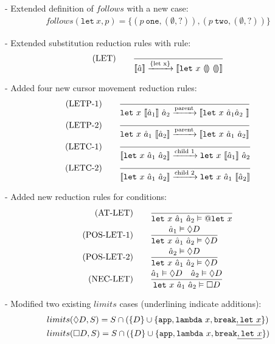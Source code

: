 \documentclass[10pt,a4paper,english]{article}
\newcommand\letin[3]{\texttt{let}~#1~#2~#3}
\begin{document}
- Extended definition of $follows$ with a new case:
\begin{align}
follows(\texttt{let}~x, p) = \{ (p~\texttt{one}, (\emptyset, ?)), (p~\texttt{two}, (\emptyset, ?)) \}
\end{align}


- Extended substitution reduction rules with rule:
\begin{align}
(\text{LET})\qquad
\frac{}{\cursor{\hat{a}}\transition{\{let x\}}\cursor{\letin{x}{\hole}{\hole}}}
\end{align}

- Added four new cursor movement reduction rules:
\begin{align}
  (\text{LETP-1}) \qquad &\frac{}{\letin{x}{\cursor{\hat{a}_1}}{\hat{a}_2}\transition{parent}\cursor{\letin{x}{\hat{a}_1{\hat{a}_2}}}}\\
(\text{LETP-2}) \qquad &\frac{}{\letin{x}{\hat{a}_1}{\cursor{\hat{a}_2}}\transition{parent}\cursor{\letin{x}{\hat{a}_1}{\hat{a}_2}}}\\
(\text{LETC-1}) \qquad &\frac{}{\cursor{\letin{x}{\hat{a}_1}{\hat{a}_2}}\transition{child 1}\letin{x}{\cursor{\hat{a}_1}}{\hat{a}_2}}\\
(\text{LETC-2}) \qquad &\frac{}{\cursor{\letin{x}{\hat{a}_1}{\hat{a}_2}}\transition{child 2}\letin{x}{\hat{a}_1}{\cursor{\hat{a}_2}}}
\end{align}

- Added new reduction rules for conditions:
\begin{align}
  (\text{AT-LET})\qquad&\frac{}{\letin{x}{\hat{a}_1}{\hat{a}_2} \vDash \at\texttt{let}~x}\\
  (\text{POS-LET-1})\qquad&\frac{\hat{a}_1\vDash\possibly D}{\letin{x}{\hat{a}_1}{\hat{a}_2} \vDash \possibly D}\\
  (\text{POS-LET-2})\qquad&\frac{\hat{a}_2\vDash\possibly D}{\letin{x}{\hat{a}_1}{\hat{a}_2} \vDash \possibly D}\\
  (\text{NEC-LET})\qquad&\frac{\hat{a}_1\vDash\possibly D \quad \hat{a}_2\vDash\possibly D}{\letin{x}{\hat{a}_1}{\hat{a}_2} \vDash \necessarily D}
\end{align}

- Modified two existing $limits$ cases (underlining indicate additions):
\begin{align}
&limits(\Diamond D, S) = S \cap (\{D\} \cup \{\texttt{app}, \texttt{lambda}~x, \texttt{break}\underline{, \texttt{let}~x}\})\\
&limits(\Box D, S) = S \cap (\{D\} \cup \{\texttt{app}, \texttt{lambda}~x, \texttt{break}\underline{, \texttt{let}~x}\})
\end{align}
\end{document}
